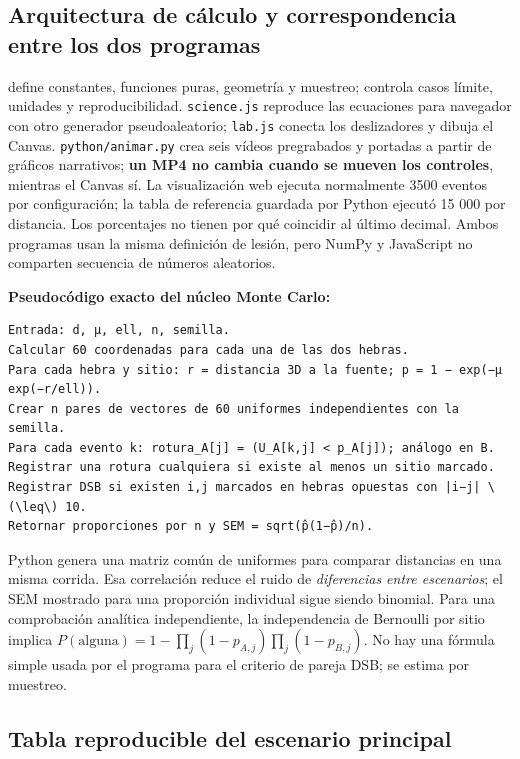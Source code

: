 \documentclass[11pt,a4paper,oneside]{article}
\begin{document}
\subsection{Arquitectura de cálculo y correspondencia entre los dos programas}\label{arquitectura-de-cuxe1lculo-y-correspondencia-entre-los-dos-programas}

 define constantes, funciones puras, geometría y muestreo;  controla casos límite, unidades y reproducibilidad. \texttt{science.js} reproduce las ecuaciones para navegador con otro generador pseudoaleatorio; \texttt{lab.js} conecta los deslizadores y dibuja el Canvas. \texttt{python/animar.py} crea seis vídeos pregrabados y portadas a partir de gráficos narrativos; \textbf{un MP4 no cambia cuando se mueven los controles}, mientras el Canvas sí. La visualización web ejecuta normalmente 3500 eventos por configuración; la tabla de referencia guardada por Python ejecutó 15 000 por distancia. Los porcentajes no tienen por qué coincidir al último decimal. Ambos programas usan la misma definición de lesión, pero NumPy y JavaScript no comparten secuencia de números aleatorios.

\textbf{Pseudocódigo exacto del núcleo Monte Carlo:}

\begin{verbatim}
Entrada: d, μ, ell, n, semilla.
Calcular 60 coordenadas para cada una de las dos hebras.
Para cada hebra y sitio: r = distancia 3D a la fuente; p = 1 − exp(−μ exp(−r/ell)).
Crear n pares de vectores de 60 uniformes independientes con la semilla.
Para cada evento k: rotura_A[j] = (U_A[k,j] < p_A[j]); análogo en B.
Registrar una rotura cualquiera si existe al menos un sitio marcado.
Registrar DSB si existen i,j marcados en hebras opuestas con |i−j| \(\leq\) 10.
Retornar proporciones por n y SEM = sqrt(p̂(1−p̂)/n).
\end{verbatim}

Python genera una matriz común de uniformes para comparar distancias en una misma corrida. Esa correlación reduce el ruido de \emph{diferencias entre escenarios}; el SEM mostrado para una proporción individual sigue siendo binomial. Para una comprobación analítica independiente, la independencia de Bernoulli por sitio implica \(P(\text{alguna})=1-\prod_j(1-p_{A,j})\prod_j(1-p_{B,j})\). No hay una fórmula simple usada por el programa para el criterio de pareja DSB; se estima por muestreo.

\subsection{Tabla reproducible del escenario principal}\label{tabla-reproducible-del-escenario-principal}
\end{document}
